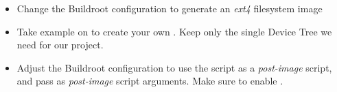\begin{itemize}

\item Change the Buildroot configuration to generate an {\em ext4}
  filesystem image

\item Take example on  to create
  your own . Keep only
  the single Device Tree we need for our project.

\item Adjust the Buildroot configuration to use the
   script as a {\em post-image}
  script, and pass 
  as {\em post-image} script arguments. Make sure to enable
  .

\end{itemize}
